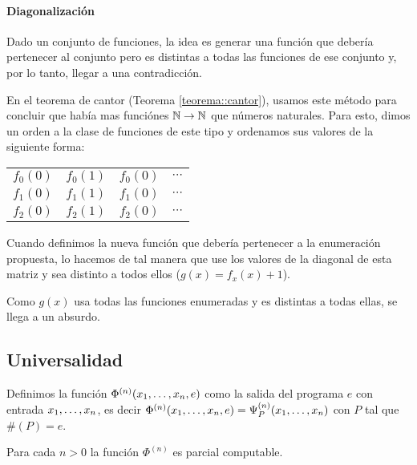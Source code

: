 \paragraph{Diagonalización}
Dado un conjunto de funciones, la idea es generar una función que debería pertenecer al conjunto pero es distintas a todas las funciones de ese conjunto y, por lo tanto, llegar a una contradicción.

En el teorema de cantor (Teorema \ref{teorema::cantor}), usamos este método para concluir que había mas funciónes $\mathbb{N}\to\mathbb{N}$ que números naturales. Para esto, dimos un orden a la clase de funciones de este tipo y ordenamos sus valores de la siguiente forma:
\begin{center}
\begin{tabular}{cccc}
	$f_0(0)$ & $f_0(1)$ & $f_0(0)$ & $\cdots$ \\
	$f_1(0)$ & $f_1(1)$ & $f_1(0)$ & $\cdots$ \\
	$f_2(0)$ & $f_2(1)$ & $f_2(0)$ & $\cdots$ \\
\end{tabular}
\end{center}

Cuando definimos la nueva función que debería pertenecer a la enumeración propuesta, lo hacemos de tal manera que use los valores de la diagonal de esta matriz y sea distinto a todos ellos ($g(x) = f_x(x) + 1$).

Como $g(x)$ usa todas las funciones enumeradas y es distintas a todas ellas, se llega a un absurdo.


\subsection{Universalidad}
Definimos la función $\Phi^{(n)}(x_1,\dots, x_{n}, e)$ como la salida del programa $e$ con entrada $x_1,\dots, x_{n}$, es decir $\Phi^{(n)}(x_1,\dots, x_{n}, e) = \Psi_P^{(n)}(x_1,\dots, x_{n})$ con $P$ tal que $\#(P) = e$.

\begin{teorema}\label{teorema::phiEsParcialComputable}
	Para cada $n > 0$ la función $\Phi^{(n)}$ es parcial computable.
\end{teorema}

